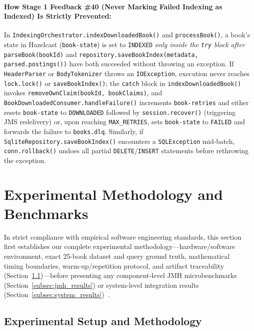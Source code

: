 \documentclass[10pt,a4paper]{article}
\begin{document}
\paragraph{How Stage 1 Feedback \#40 (Never Marking Failed Indexing as Indexed) Is Strictly Prevented:}
In \texttt{IndexingOrchestrator.indexDownloadedBook()} and \texttt{processBook()}, a book's state in Hazelcast (\texttt{book-state}) is set to \texttt{INDEXED} \emph{only inside the \texttt{try} block after} \texttt{parseBook(bookId)} and \texttt{repository.saveBookIndex(metadata, parsed.postings())} have both succeeded without throwing an exception. If \texttt{HeaderParser} or \texttt{BodyTokenizer} throws an \texttt{IOException}, execution never reaches \texttt{lock.lock()} or \texttt{saveBookIndex()}; the \texttt{catch} block in \texttt{indexDownloadedBook()} invokes \texttt{removeOwnClaim(bookId, bookClaims)}, and \texttt{BookDownloadedConsumer.handleFailure()} increments \texttt{book-retries} and either resets \texttt{book-state} to \texttt{DOWNLOADED} followed by \texttt{session.recover()} (triggering JMS redelivery) or, upon reaching \texttt{MAX\_RETRIES}, sets \texttt{book-state} to \texttt{FAILED} and forwards the failure to \texttt{books.dlq}. Similarly, if \texttt{SqliteRepository.saveBookIndex()} encounters a \texttt{SQLException} mid-batch, \texttt{conn.rollback()} undoes all partial \texttt{DELETE}/\texttt{INSERT} statements before rethrowing the exception.

\section{Experimental Methodology and Benchmarks}
\label{sec:benchmarks}

In strict compliance with empirical software engineering standards, this section first establishes our complete experimental methodology---hardware/software environment, exact 25-book dataset and query ground truth, mathematical timing boundaries, warm-up/repetition protocol, and artifact traceability (Section~\ref{subsec:methodology})---before presenting any component-level JMH microbenchmarks (Section~\ref{subsec:jmh_results}) or system-level integration results (Section~\ref{subsec:system_results})~\cite{fourbytees_benchmarks}.

\subsection{Experimental Setup and Methodology}
\label{subsec:methodology}
\end{document}
